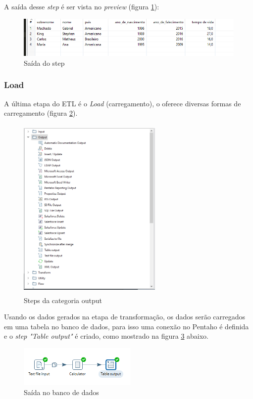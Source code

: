 A saída desse \textit{step} é ser vista no \textit{preview} (figura \ref{preview}):
\begin{figure}[H]
\centering
\includegraphics[height=2cm]{imagens/saidavida.png}
\caption{Saída do step}
\label{preview}
\end{figure}
\subsubsection{Load}
A última etapa do ETL é o \textit{Load} (carregamento), o \pdi oferece diversas formas de carregamento (figura \ref{outputsteps}).
\begin{figure}[H]
\centering
\includegraphics[width=7cm, height=9cm]{imagens/output.png}
\caption{Steps da categoria output}
\label{outputsteps}
\end{figure}
Usando os dados gerados na etapa de transformação, os dados serão carregados em uma tabela no banco de dados, para isso uma conexão no Pentaho é definida e o \textit{step} \textit{"Table output"} é criado, como mostrado na figura \ref{outputstep} abaixo.
\begin{figure}[H]
\centering
\includegraphics[height=2cm]{imagens/tableoutput.png}
\caption{Saída no banco de dados}
\label{outputstep}
\end{figure}

